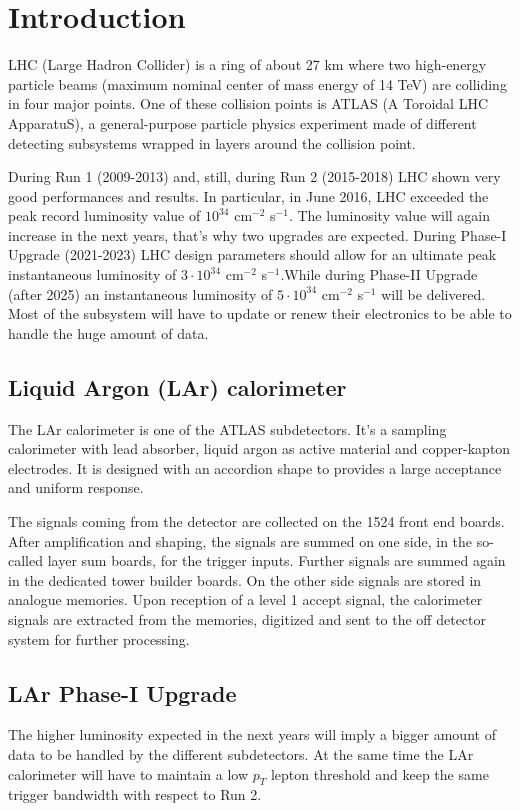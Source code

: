 \documentclass{llncs}
\begin{document}
\section{Introduction}
LHC (Large Hadron Collider) is a ring of about 27 km where two high-energy particle beams (maximum nominal center of mass energy of 14 TeV) are colliding in four major points. One of these collision points is ATLAS (A Toroidal LHC ApparatuS), a general-purpose particle physics experiment made of different detecting subsystems wrapped in layers around the collision point.

During Run 1 (2009-2013) and, still, during Run 2 (2015-2018) LHC shown very good performances and results. In particular, in June 2016, LHC exceeded the peak record luminosity value of $10^{34}$ cm$^{-2}$ s$^{-1}$. The luminosity value will again increase in the next years, that's why two upgrades are expected. During Phase-I Upgrade (2021-2023) LHC design parameters should allow for an ultimate peak instantaneous luminosity of $3 \cdot 10^{34}$ cm$^{-2}$ s$^{-1}$.While during Phase-II Upgrade (after 2025) an instantaneous luminosity of $5 \cdot 10^{34}$ cm$^{-2}$ s$^{-1}$ will be delivered. Most of the subsystem will have to update or renew their electronics to be able to handle the huge amount of data.

\subsection{Liquid Argon (LAr) calorimeter}
The LAr calorimeter is one of the ATLAS subdetectors. It's a sampling calorimeter with lead absorber, liquid argon as active material and copper-kapton electrodes. It is designed with an accordion shape to provides a large acceptance and uniform response.

The signals coming from the detector are collected on the 1524 front end boards. After amplification and shaping, the signals are summed on one side, in the so-called layer sum boards, for the trigger inputs. Further signals are summed again in the dedicated tower builder boards. On the other side signals are stored in analogue memories. Upon reception of a level 1 accept signal, the calorimeter signals are extracted from the memories, digitized and sent to the off detector system for further processing.
\cite{Wilken:1269029} \cite{Aleksa:1602230}

\subsection{LAr Phase-I Upgrade}
The higher luminosity expected in the next years will imply a bigger amount of data to be handled by the different subdetectors. At the same time the LAr calorimeter will have to maintain a low $p_{T}$ lepton threshold and keep the same trigger bandwidth with respect to Run 2.
\end{document}
